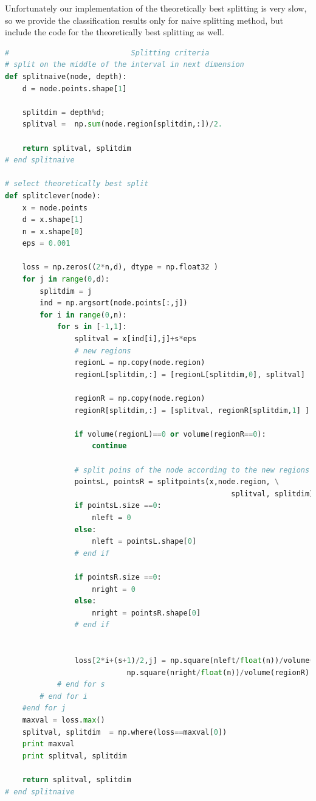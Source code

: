 \documentclass{article}
\begin{document}
Unfortunately our implementation of the theoretically best splitting is very slow, so we provide the classification results only for naive splitting method, but include the code for the theoretically best splitting as well.
 
\begin{lstlisting}[language=Python]
#                            Splitting criteria
# split on the middle of the interval in next dimension
def splitnaive(node, depth):
    d = node.points.shape[1]
    
    splitdim = depth%d;
    splitval =  np.sum(node.region[splitdim,:])/2.   
    
    return splitval, splitdim
# end splitnaive
    
# select theoretically best split
def splitclever(node):
    x = node.points
    d = x.shape[1]
    n = x.shape[0]
    eps = 0.001
    
    loss = np.zeros((2*n,d), dtype = np.float32 )
    for j in range(0,d):
        splitdim = j
        ind = np.argsort(node.points[:,j])
        for i in range(0,n):
            for s in [-1,1]:
                splitval = x[ind[i],j]+s*eps
                # new regions
                regionL = np.copy(node.region)
                regionL[splitdim,:] = [regionL[splitdim,0], splitval]
            
                regionR = np.copy(node.region)       
                regionR[splitdim,:] = [splitval, regionR[splitdim,1] ]           
                
                if volume(regionL)==0 or volume(regionR==0):
                    continue
                
                # split poins of the node according to the new regions
                pointsL, pointsR = splitpoints(x,node.region, \
                                                    splitval, splitdim)
                if pointsL.size ==0:
                    nleft = 0
                else:
                    nleft = pointsL.shape[0]
                # end if    
    
                if pointsR.size ==0:
                    nright = 0
                else:
                    nright = pointsR.shape[0]
                # end if    
                
                
                loss[2*i+(s+1)/2,j] = np.square(nleft/float(n))/volume(regionL) + \
                            np.square(nright/float(n))/volume(regionR)
            # end for s
        # end for i    
    #end for j
    maxval = loss.max()
    splitval, splitdim  = np.where(loss==maxval[0])       
    print maxval
    print splitval, splitdim
    
    return splitval, splitdim
# end splitnaive
\end{lstlisting}
\end{document}
